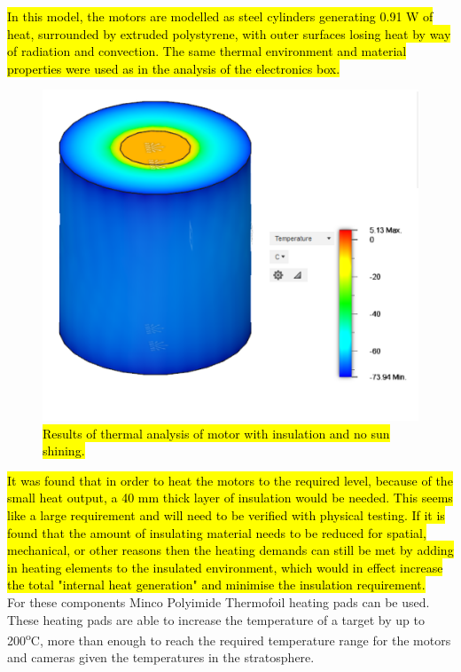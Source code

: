 \hl{In this model, the motors are modelled as steel cylinders generating 0.91 W of heat, surrounded by extruded polystyrene, with outer surfaces losing heat by way of radiation and convection. The same thermal environment and material properties were used as in the analysis of the electronics box.}\\

	\begin{figure}[H]
    \centering
    \includegraphics[scale=0.6]{4-experiment-design/img/mechanical/thermalmotors.PNG}
	\caption{\hl{Results of thermal analysis of motor with insulation and no sun shining.}}
	\label{fig:thermalmotors}
	\end{figure}

\hl{It was found that in order to heat the motors to the required level, because of the small heat output, a 40 mm thick layer of insulation would be needed. This seems like a large requirement and will need to be verified with physical testing. If it is found that the amount of insulating material needs to be reduced for spatial, mechanical, or other reasons then the heating demands can still be met by adding in heating elements to the insulated environment, which would in effect increase the total "internal heat generation" and minimise the insulation requirement.}\\

For these components Minco Polyimide Thermofoil heating pads can be used. These heating pads are able to increase the temperature of a target by up to 200\textsuperscript{o}C, more than enough to reach the required temperature range for the motors and cameras given the temperatures in the stratosphere.\\

